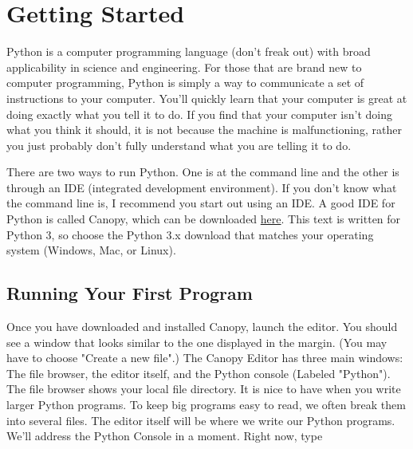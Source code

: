 \chapter{Getting Started}
\label{chap:GettingStarted}


Python is a computer programming language (don't freak out) with broad
applicability in science and engineering.  For those that are brand
new to computer programming, Python is simply a way to communicate a
set of instructions to your computer.  You'll quickly learn that your
computer is great at doing exactly what you tell it to do.  If you
find that your computer isn't doing what you think it should, it is
not because the machine is malfunctioning, rather you just probably
don't fully understand what you are telling it to do.

There are two ways to run Python. One is at the command line and the
other is through an IDE (integrated development environment). If you
don't know what the command line is, I recommend you start out using
an IDE. A good IDE for Python is called Canopy, which can
be downloaded \href{https://store.enthought.com/downloads/}{here}. This text is written for Python 3, so choose the Python 3.x download that matches your operating system (Windows, Mac, or Linux).


\section{Running Your First Program}

Once you have downloaded and installed Canopy, launch the editor. You should see a window that looks similar to the one displayed in the margin. (You may have to choose "Create a new file".) The Canopy Editor has three main windows: The file browser, the editor itself, and the Python console (Labeled "Python").
The file browser shows your local file directory.  It is nice to have when you write larger Python programs. To keep big programs easy to read, we often break them into several files.
The editor itself will be where we write our Python programs. We'll address the Python Console in a moment. Right now, type

